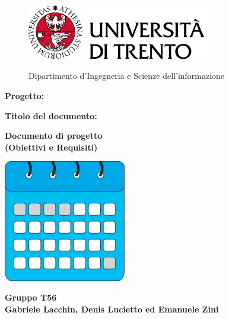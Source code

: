 \begin{titlepage}
    \begin{figure}[!htb]
        \includegraphics[width=0.7\textwidth]{img/logo_unitn.png}
        \endminipage
        \hfill
        \begin{flushright}
            \Large
            Dipartimento d'Ingegneria e Scienze dell'informazione
        \end{flushright}
        \endminipage
        \hfill
    \end{figure}

    \vspace{3cm}

    \large
    \textbf{Progetto:}
    \begin{center}
        \Huge
        \color{blue}
        \textbf{\nome}
    \end{center}

    \vspace{1cm}

    \textbf{Titolo del documento:}
    \begin{center}
        \huge
        \color{blue}
        \textbf{Documento di progetto}\\
        \textbf{(Obiettivi e Requisiti)}
    \end{center}

    \vspace{3cm}

    \begin{center}
        \includegraphics[width=0.4\textwidth]{img/Logo/logo.jpg}
    \end{center}
    \vspace{3cm}

    \begin{center}
        \large
        \textbf{Gruppo T56}\\
        \textbf{Gabriele Lacchin, Denis Lucietto ed Emanuele Zini}
    \end{center}

\end{titlepage}